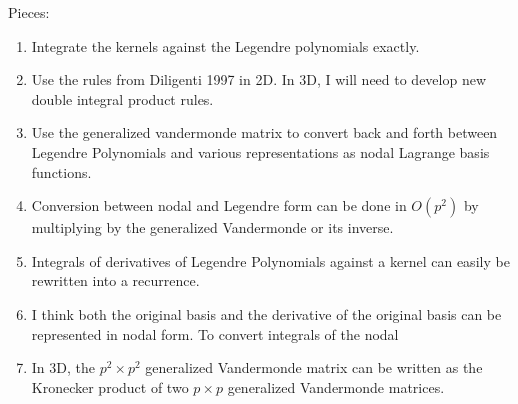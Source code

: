 \documentclass[a4paper,12pt]{article}
\begin{document}
Pieces:
\begin{enumerate}
        \item Integrate the kernels against the Legendre polynomials exactly.
        \item Use the rules from Diligenti 1997 in 2D. In 3D, I will need to develop new double integral product rules.
        \item Use the generalized vandermonde matrix to convert back and forth between Legendre Polynomials and various representations as nodal Lagrange basis functions. 
        \item Conversion between nodal and Legendre form can be done in $O(p^2)$ by multiplying by the generalized Vandermonde or its inverse.
        \item Integrals of derivatives of Legendre Polynomials against a kernel can easily be rewritten into a recurrence.
        \item I think both the original basis and the derivative of the original basis can be represented in nodal form. To convert integrals of the nodal 
        \item In 3D, the $p^2 \times p^2$ generalized Vandermonde matrix can be written as the Kronecker product of two $p \times p$ generalized Vandermonde matrices. 
\end{enumerate}
\end{document}
